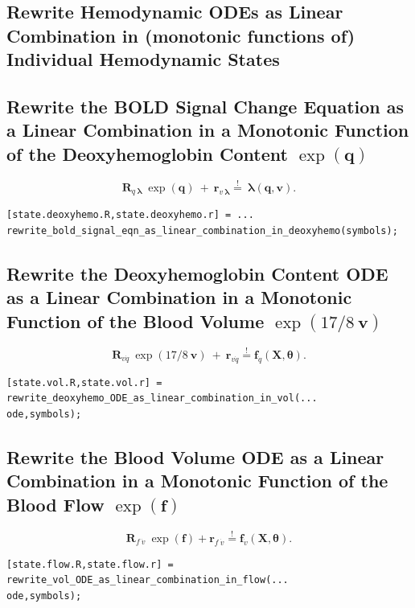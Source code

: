 \begin{par}
\section{Rewrite Hemodynamic ODEs as Linear Combination in (monotonic functions of) Individual Hemodynamic States}

\subsection{Rewrite the BOLD Signal Change Equation as a Linear Combination in a Monotonic Function of the Deoxyhemoglobin Content $\exp(\mathbf{q})$}

$$\mathbf{R}_{q~\mathbf\lambda} ~ \exp(\mathbf{q}) ~+ ~
\mathbf{r}_{v~\mathbf\lambda} \stackrel{!}{=} ~\mathbf\lambda(\mathbf{q},\mathbf{v}).$$
    \color{RoyalPurple}\begin{verbatim}
[state.deoxyhemo.R,state.deoxyhemo.r] = ...
rewrite_bold_signal_eqn_as_linear_combination_in_deoxyhemo(symbols);
\end{verbatim} 
\color{black}

\subsection{Rewrite the Deoxyhemoglobin Content ODE as a Linear Combination in a Monotonic Function of the Blood Volume $\exp\left( 17 / 8 ~\mathbf{v}\right)$}

$$\mathbf{R}_{v\dot{q}} ~\exp\left( 17 / 8 ~\mathbf{v}\right)
~+~ \mathbf{r}_{v\dot{q}} \stackrel{!}{=} \mathbf{f}_{\dot{q}}(\mathbf{X},\boldsymbol\theta).$$
    \color{RoyalPurple}\begin{verbatim}
[state.vol.R,state.vol.r] = rewrite_deoxyhemo_ODE_as_linear_combination_in_vol(...
ode,symbols);
\end{verbatim} 
\color{black}

\subsection{Rewrite the Blood Volume ODE as a Linear Combination in a Monotonic Function of the Blood Flow $\exp(\mathbf{f})$}
    
$$\mathbf{R}_{f~\dot{v}} ~ \exp(\mathbf{f}) + \mathbf{r}_{f~\dot{v}}
\stackrel{!}{=} \mathbf{f}_{\dot{v}}(\mathbf{X},\boldsymbol\theta).$$
    \color{RoyalPurple}\begin{verbatim}
[state.flow.R,state.flow.r] = rewrite_vol_ODE_as_linear_combination_in_flow(...
ode,symbols);
\end{verbatim} 
\color{black}

\end{par}
